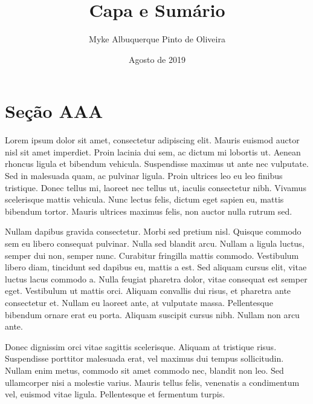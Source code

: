 \documentclass{article}
\begin{document}
	\title{\textbf{{\Huge Capa e Sumário}}}
	\author{Myke Albuquerque Pinto de Oliveira}
	\date{Agosto de 2019}
	
	\maketitle
	\thispagestyle{empty}
	\newpage
	
	\setcounter{page}{1}
	\tableofcontents
	\newpage
	
	\listoffigures
	\newpage
	
	\listoftables
	\newpage
	
	\setcounter{page}{1}
	\section{Seção AAA}
	Lorem ipsum dolor sit amet, consectetur adipiscing elit. Mauris euismod auctor nisl sit amet imperdiet. Proin lacinia dui sem, ac dictum mi lobortis ut. Aenean rhoncus ligula et bibendum vehicula. Suspendisse maximus ut ante nec vulputate. Sed in malesuada quam, ac pulvinar ligula. Proin ultrices leo eu leo finibus tristique. Donec tellus mi, laoreet nec tellus ut, iaculis consectetur nibh. Vivamus scelerisque mattis vehicula. Nunc lectus felis, dictum eget sapien eu, mattis bibendum tortor. Mauris ultrices maximus felis, non auctor nulla rutrum sed.
	
	Nullam dapibus gravida consectetur. Morbi sed pretium nisl. Quisque commodo sem eu libero consequat pulvinar. Nulla sed blandit arcu. Nullam a ligula luctus, semper dui non, semper nunc. Curabitur fringilla mattis commodo. Vestibulum libero diam, tincidunt sed dapibus eu, mattis a est. Sed aliquam cursus elit, vitae luctus lacus commodo a. Nulla feugiat pharetra dolor, vitae consequat est semper eget. Vestibulum ut mattis orci. Aliquam convallis dui risus, et pharetra ante consectetur et. Nullam eu laoreet ante, at vulputate massa. Pellentesque bibendum ornare erat eu porta. Aliquam suscipit cursus nibh. Nullam non arcu ante.
	
	Donec dignissim orci vitae sagittis scelerisque. Aliquam at tristique risus. Suspendisse porttitor malesuada erat, vel maximus dui tempus sollicitudin. Nullam enim metus, commodo sit amet commodo nec, blandit non leo. Sed ullamcorper nisi a molestie varius. Mauris tellus felis, venenatis a condimentum vel, euismod vitae ligula. Pellentesque et fermentum turpis.
	
\end{document}
